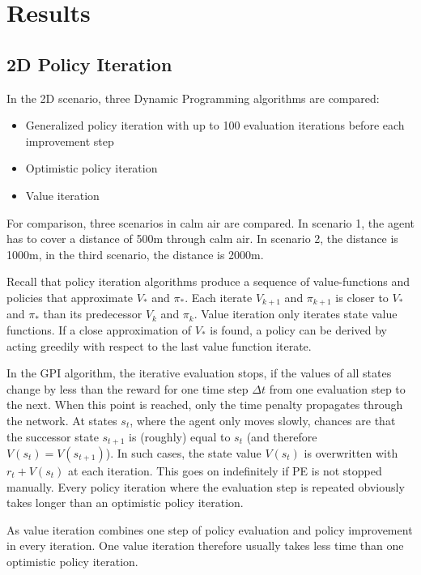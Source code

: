 \chapter{Results}
\label{chapter6}

\section{2D Policy Iteration}
\label{sec:results2d}
In the 2D scenario, three Dynamic Programming algorithms are compared:

\begin{itemize}
	\item Generalized policy iteration with up to 100 evaluation iterations before each improvement step
	\item Optimistic policy iteration
	\item Value iteration
\end{itemize}

For comparison, three scenarios in calm air are compared. In scenario 1, the agent has to cover a distance of 500m through calm air. In scenario 2, the distance is 1000m, in the third scenario, the distance is 2000m.

Recall that policy iteration algorithms produce a sequence of value-functions and policies that approximate $V_*$ and $\pi_*$. Each iterate $V_{k+1}$ and $\pi_{k+1}$ is closer to $V_*$ and $\pi_*$ than its predecessor $V_k$ and $\pi_k$. Value iteration only iterates state value functions. If a close approximation of $V_*$ is found, a policy can be derived by acting greedily with respect to the last value function iterate.

In the GPI algorithm, the iterative evaluation stops, if the values of all states change by less than the reward for one time step $\Delta t$ from one evaluation step to the next. When this point is reached, only the time penalty propagates through the network. At states $s_t$, where the agent only moves slowly, chances are that the successor state $s_{t+1}$ is (roughly) equal to $s_t$ (and therefore $V(s_t)=V(s_{t+1})$). In such cases, the state value $V(s_t)$ is overwritten with $r_t + V(s_t)$ at each iteration. This goes on indefinitely if PE is not stopped manually. Every policy iteration where the evaluation step is repeated obviously takes longer than an optimistic policy iteration.

As value iteration combines one step of policy evaluation and policy improvement in every iteration. One value iteration therefore usually takes less time than one optimistic policy iteration.

